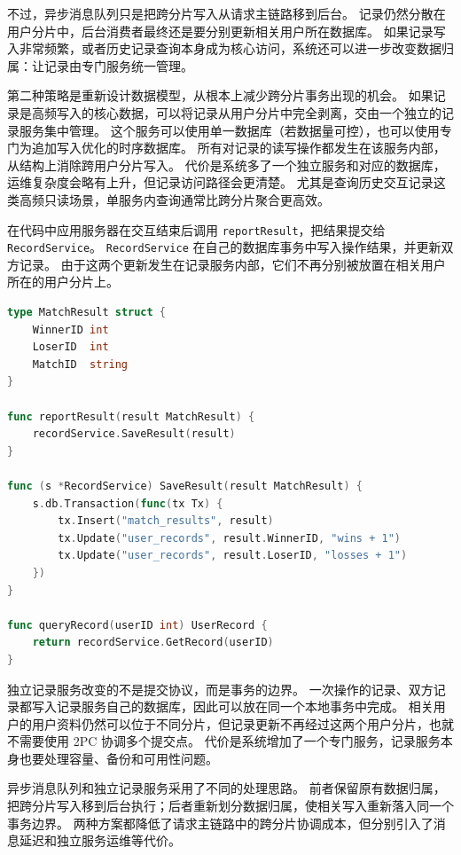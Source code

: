 不过，异步消息队列只是把跨分片写入从请求主链路移到后台。
记录仍然分散在用户分片中，后台消费者最终还是要分别更新相关用户所在数据库。
如果记录写入非常频繁，或者历史记录查询本身成为核心访问，系统还可以进一步改变数据归属：让记录由专门服务统一管理。

第二种策略是重新设计数据模型，从根本上减少跨分片事务出现的机会。
如果记录是高频写入的核心数据，可以将记录从用户分片中完全剥离，交由一个独立的记录服务集中管理。
这个服务可以使用单一数据库（若数据量可控），也可以使用专门为追加写入优化的时序数据库。
所有对记录的读写操作都发生在该服务内部，从结构上消除跨用户分片写入。
代价是系统多了一个独立服务和对应的数据库，运维复杂度会略有上升，但记录访问路径会更清楚。
尤其是查询历史交互记录这类高频只读场景，单服务内查询通常比跨分片聚合更高效。

在代码中应用服务器在交互结束后调用 \texttt{reportResult}，把结果提交给 \texttt{RecordService}。
\texttt{RecordService} 在自己的数据库事务中写入操作结果，并更新双方记录。
由于这两个更新发生在记录服务内部，它们不再分别被放置在相关用户所在的用户分片上。

\begin{tcolorbox}[title=独立记录服务的核心逻辑]
\begin{lstlisting}[style=codeblock, language=go]
type MatchResult struct {
    WinnerID int
    LoserID  int
    MatchID  string
}

func reportResult(result MatchResult) {
    recordService.SaveResult(result)
}

func (s *RecordService) SaveResult(result MatchResult) {
    s.db.Transaction(func(tx Tx) {
        tx.Insert("match_results", result)
        tx.Update("user_records", result.WinnerID, "wins + 1")
        tx.Update("user_records", result.LoserID, "losses + 1")
    })
}

func queryRecord(userID int) UserRecord {
    return recordService.GetRecord(userID)
}
\end{lstlisting}
\end{tcolorbox}

独立记录服务改变的不是提交协议，而是事务的边界。
一次操作的记录、双方记录都写入记录服务自己的数据库，因此可以放在同一个本地事务中完成。
相关用户的用户资料仍然可以位于不同分片，但记录更新不再经过这两个用户分片，也就不需要使用 2PC 协调多个提交点。
代价是系统增加了一个专门服务，记录服务本身也要处理容量、备份和可用性问题。

异步消息队列和独立记录服务采用了不同的处理思路。
前者保留原有数据归属，把跨分片写入移到后台执行；后者重新划分数据归属，使相关写入重新落入同一个事务边界。
两种方案都降低了请求主链路中的跨分片协调成本，但分别引入了消息延迟和独立服务运维等代价。

